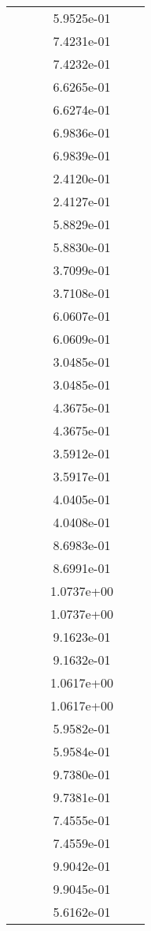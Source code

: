 \begin{xltabular}{\textwidth}{r|rS[table-format=1.3e+2]S[table-format=1.4e+2]S[table-format=1.4e+2]S[table-format=-1.5]}
&  &  & 5.9525e-01 & & \\
&  &  & 7.4231e-01 & & \\
&  &  & 7.4232e-01 & & \\
&  &  & 6.6265e-01 & & \\
&  &  & 6.6274e-01 & & \\
&  &  & 6.9836e-01 & & \\
&  &  & 6.9839e-01 & & \\
&  &  & 2.4120e-01 & & \\
&  &  & 2.4127e-01 & & \\
&  &  & 5.8829e-01 & & \\
&  &  & 5.8830e-01 & & \\
&  &  & 3.7099e-01 & & \\
&  &  & 3.7108e-01 & & \\
&  &  & 6.0607e-01 & & \\
&  &  & 6.0609e-01 & & \\
&  &  & 3.0485e-01 & & \\
&  &  & 3.0485e-01 & & \\
&  &  & 4.3675e-01 & & \\
&  &  & 4.3675e-01 & & \\
&  &  & 3.5912e-01 & & \\
&  &  & 3.5917e-01 & & \\
&  &  & 4.0405e-01 & & \\
&  &  & 4.0408e-01 & & \\
&  &  & 8.6983e-01 & & \\
&  &  & 8.6991e-01 & & \\
&  &  & 1.0737e+00 & & \\
&  &  & 1.0737e+00 & & \\
&  &  & 9.1623e-01 & & \\
&  &  & 9.1632e-01 & & \\
&  &  & 1.0617e+00 & & \\
&  &  & 1.0617e+00 & & \\
&  &  & 5.9582e-01 & & \\
&  &  & 5.9584e-01 & & \\
&  &  & 9.7380e-01 & & \\
&  &  & 9.7381e-01 & & \\
&  &  & 7.4555e-01 & & \\
&  &  & 7.4559e-01 & & \\
&  &  & 9.9042e-01 & & \\
&  &  & 9.9045e-01 & & \\
&  &  & 5.6162e-01 & & \\

\end{xltabular}
